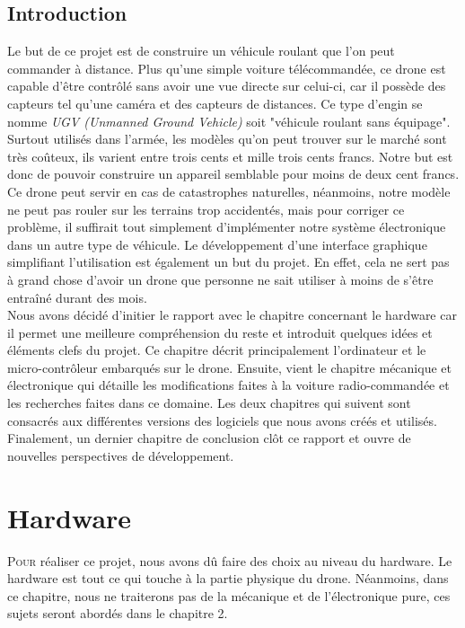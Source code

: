 \documentclass[a4paper,11pt]{report}
\begin{document}
{\section*{Introduction}
Le but de ce projet est de construire un véhicule roulant que l'on peut
commander à distance. Plus qu'une simple voiture télécommandée, ce drone est
capable d'être contrôlé sans avoir une vue directe sur celui-ci, car il
possède des capteurs tel qu'une caméra et des capteurs de distances. Ce type
d'engin se nomme \textit{UGV (Unmanned Ground Vehicle)} soit "véhicule roulant
sans équipage". Surtout utilisés dans l'armée, les modèles qu'on peut trouver
sur le marché sont très coûteux, ils varient entre trois cents et mille trois
cents francs. Notre but est donc de pouvoir construire un appareil semblable
pour moins de deux cent francs. 
Ce drone peut servir en cas de catastrophes
naturelles, néanmoins, notre modèle ne peut pas rouler sur les terrains trop
accidentés, mais pour corriger ce problème, il suffirait tout simplement
d'implémenter notre système électronique dans un autre type de véhicule. Le développement d'une interface graphique simplifiant l'utilisation est é\-ga\-le\-ment un but du projet. En effet, cela ne sert pas à grand chose d'avoir un drone que personne ne sait utiliser à moins de s'être entraîné durant des mois.\\
Nous avons décidé d'initier le rapport avec le chapitre concernant le hardware
car il permet une meilleure
compréhension du reste et introduit quel\-ques idées et éléments clefs du projet. Ce chapitre décrit principalement l'ordinateur et le
micro-contrôleur \cite{microcontroleur} embarqués sur le drone. Ensuite, vient
le chapitre mé\-ca\-ni\-que et électronique qui détaille les modifications
faites à la voiture ra\-dio-\-com\-man\-dée et les recherches faites dans ce
domaine. Les deux chapitres qui suivent sont consacrés aux différentes
versions des logiciels que nous avons créés et utilisés. Finalement, un dernier chapitre
de conclusion clôt ce rapport et ouvre de nouvelles perspectives de développement.
\clearpage


\chapter{Hardware}


\lettrine{P}{our} réaliser ce projet, nous avons dû faire des choix au niveau
du hardware. Le hardware est tout ce qui touche à la partie physique du drone.
Néanmoins, dans ce chapitre, nous ne traiterons pas de la mécanique et de
l'électronique pure, ces sujets
seront abordés dans le chapitre 2. 

}
\end{document}
